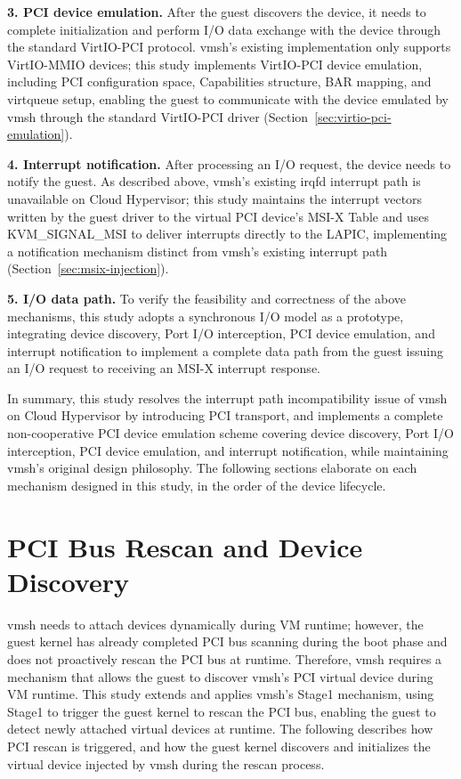 \begin{ZhChapter}
\textbf{3. PCI device emulation.} After the guest discovers the device, it needs to complete initialization and perform I/O data exchange with the device through the standard VirtIO-PCI protocol. vmsh's existing implementation only supports VirtIO-MMIO devices; this study implements VirtIO-PCI device emulation, including PCI configuration space, Capabilities structure, BAR mapping, and virtqueue setup, enabling the guest to communicate with the device emulated by vmsh through the standard VirtIO-PCI driver (Section~\ref{sec:virtio-pci-emulation}).

\begin{sloppypar}
\textbf{4. Interrupt notification.} After processing an I/O request, the device needs to notify the guest. As described above, vmsh's existing irqfd interrupt path is unavailable on Cloud Hypervisor; this study maintains the interrupt vectors written by the guest driver to the virtual PCI device's MSI-X Table and uses KVM\_SIGNAL\_MSI to deliver interrupts directly to the LAPIC, implementing a notification mechanism distinct from vmsh's existing interrupt path (Section~\ref{sec:msix-injection}).
\end{sloppypar}

\textbf{5. I/O data path.} To verify the feasibility and correctness of the above mechanisms, this study adopts a synchronous I/O model as a prototype, integrating device discovery, Port I/O interception, PCI device emulation, and interrupt notification to implement a complete data path from the guest issuing an I/O request to receiving an MSI-X interrupt response.

In summary, this study resolves the interrupt path incompatibility issue of vmsh on Cloud Hypervisor by introducing PCI transport, and implements a complete non-cooperative PCI device emulation scheme covering device discovery, Port I/O interception, PCI device emulation, and interrupt notification, while maintaining vmsh's original design philosophy. The following sections elaborate on each mechanism designed in this study, in the order of the device lifecycle.

\section{PCI Bus Rescan and Device Discovery}
\label{sec:pci-rescan}

vmsh needs to attach devices dynamically during VM runtime; however, the guest kernel has already completed PCI bus scanning during the boot phase and does not proactively rescan the PCI bus at runtime. Therefore, vmsh requires a mechanism that allows the guest to discover vmsh's PCI virtual device during VM runtime. This study extends and applies vmsh's Stage1 mechanism, using Stage1 to trigger the guest kernel to rescan the PCI bus, enabling the guest to detect newly attached virtual devices at runtime. The following describes how PCI rescan is triggered, and how the guest kernel discovers and initializes the virtual device injected by vmsh during the rescan process.


\end{ZhChapter}
